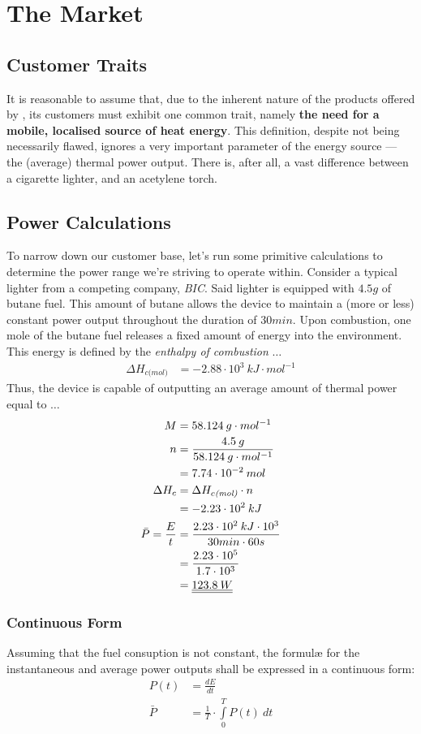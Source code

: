 \section{The Market}
\subsection{Customer Traits}
It is reasonable to assume that, due to the inherent nature of the products offered by \fw, its customers must
exhibit one common trait, namely \textbf{the need for a mobile, localised source of heat energy}.
This definition, despite not being necessarily flawed, ignores a very important parameter of the
energy source --- the (average) thermal power output.
There is, after all, a vast difference between a cigarette lighter, and an acetylene torch.
\subsection{Power Calculations}
To narrow down our customer base, let's run some primitive calculations to determine the power range we're striving to
operate within.
Consider a typical lighter from a competing company, \textit{BIC}. Said lighter is equipped with $4.5g$ of butane fuel.
This amount of butane allows the device to maintain a (more or less) constant power output throughout the duration of $30min$.
Upon combustion, one mole of the butane fuel releases a fixed amount of energy into the environment. This energy is defined
by the \textit{enthalpy of combustion} $\dots$
\begin{align*}
	\Delta H_{c\textit{(mol)}} &= -2.88 \cdot 10^3 \: kJ \cdot mol^{-1}
\end{align*}
Thus, the device is capable of outputting an average amount of thermal power equal to $\dots$
\begin{align*}
	M &= 58.124 \: g \cdot mol^{-1} \\
	n &= \frac{4.5 \: g}{58.124 \: g \cdot mol^{-1}} \\
	  &= 7.74 \cdot 10^{-2} \: mol \\
	\Delta H_c &= \Delta H_{c\textit{(mol)}} \cdot n \\
		   &= -2.23 \cdot 10^2 \: kJ \\
	\bar{P} = \frac{E}{t} &= \frac{2.23 \cdot 10^2 \: kJ \cdot 10^3}{30min \cdot 60s} \\
			&= \frac{2.23 \cdot 10^5}{1.7 \cdot 10^3} \\
			&= \underline{\underline{123.8 \: W}}
\end{align*}
\subsubsection{Continuous Form}
Assuming that the fuel consuption is not constant, the formul{\ae} for the instantaneous and average power outputs
shall be expressed in a continuous form:
\begin{align*}
	P(t) &= \frac{dE}{dt} \\
	\bar{P} &= \frac{1}{T} \cdot \int\limits_{0}^{T} P(t) \: dt
\end{align*}
